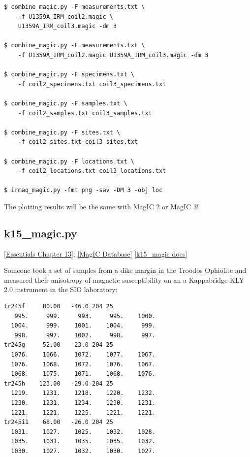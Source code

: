 \documentclass[11pt]{book}
\begin{document}
{{{{\begin{verbatim}
$ combine_magic.py -F measurements.txt \
    -f U1359A_IRM_coil2.magic \
    U1359A_IRM_coil3.magic -dm 3

$ combine_magic.py -F measurements.txt \
    -f U1359A_IRM_coil2.magic U1359A_IRM_coil3.magic -dm 3

$ combine_magic.py -F specimens.txt \
    -f coil2_specimens.txt coil3_specimens.txt

$ combine_magic.py -F samples.txt \
    -f coil2_samples.txt coil3_samples.txt

$ combine_magic.py -F sites.txt \
    -f coil2_sites.txt coil3_sites.txt

$ combine_magic.py -F locations.txt \
    -f coil2_locations.txt coil3_locations.txt

$ irmaq_magic.py -fmt png -sav -DM 3 -obj loc

\end{verbatim}

The plotting results will be the same with MagIC 2 or MagIC 3!


%
\subsection{k15\_magic.py}
\href{http://earthref.org/MAGIC/books/Tauxe/Essentials/WebBook3ch13.html#ch13}{[Essentials Chapter 13]};
\href{#MagICDatabase}{[MagIC Database]}
\href{https://github.com/PmagPy/PmagPy/blob/master/programs/k15_magic.py}{[k15\_magic docs]}


Someone took a set of samples from a dike margin in the Troodos Ophiolite and measured their anisotropy of magnetic susceptibility on an a Kappabridge KLY 2.0 instrument in the SIO laboratory:

\begin{verbatim}
tr245f     80.00   -46.0 204 25
   995.     999.     993.     995.    1000.
  1004.     999.    1001.    1004.     999.
   998.     997.    1002.     998.     997.
tr245g     52.00   -23.0 204 25
  1076.    1066.    1072.    1077.    1067.
  1076.    1068.    1072.    1076.    1067.
  1068.    1075.    1071.    1068.    1076.
tr245h    123.00   -29.0 204 25
  1219.    1231.    1218.    1220.    1232.
  1230.    1231.    1234.    1230.    1231.
  1221.    1221.    1225.    1221.    1221.
tr245i1    68.00   -26.0 204 25
  1031.    1027.    1025.    1032.    1028.
  1035.    1031.    1035.    1035.    1032.
  1030.    1027.    1032.    1030.    1027.
  \end{verbatim}

}}}}
\end{document}
